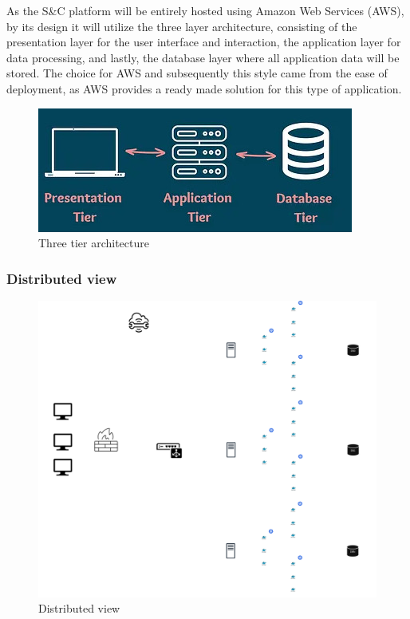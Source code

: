 As the S\&C platform will be entirely hosted using Amazon Web Services (AWS), by its design it will utilize the three layer architecture, consisting of the presentation layer for the user interface and interaction, the application layer for data processing, and lastly, the database layer where all application data will be stored. The choice for AWS and subsequently this style came from the ease of deployment, as AWS provides a ready made solution for this type of application.

\begin{figure}[h]
    \centering
    \includegraphics[width=0.75\linewidth]{DD-Latex//assets/Three tier.jpg}
    \caption{Three tier architecture \cite{MToC_2023}}
    \label{fig:enter-label}
\end{figure}

\newpage
\begin{landscape}
\subsubsection{Distributed view}
\begin{figure}[h]
    \centering
    \includegraphics[width=1\linewidth]{DD-Latex//assets//Distributed View/Distributed View.png}
    \caption{Distributed view}
    \label{fig:enter-label}
\end{figure}
\end{landscape}
